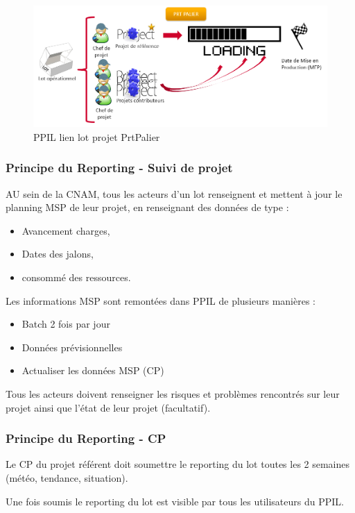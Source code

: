 \begin{figure}[!h]
\centering
\includegraphics[width=1\textwidth]{images/ppil lien lot projet prtpalier.png}
\caption{PPIL lien lot projet PrtPalier}
\end{figure}

\subsubsection{Principe du Reporting - Suivi de projet}

AU sein de la CNAM, tous les acteurs d’un lot renseignent et mettent à jour le planning MSP de leur projet, en renseignant des données de type :
\begin{itemize}
    \item Avancement charges, 
    \item Dates des jalons, 
    \item consommé des ressources.
\end{itemize}

Les informations MSP sont remontées dans PPIL de plusieurs manières :
\begin{itemize}
    \item Batch 2 fois par jour
    \item Données prévisionnelles
    \item Actualiser les données MSP (CP) 
\end{itemize}

Tous les acteurs doivent renseigner les risques et problèmes rencontrés sur leur projet ainsi que l'état de leur projet (facultatif).

\subsubsection{Principe du Reporting - CP}
Le CP du projet référent doit soumettre le reporting du lot toutes les 2 semaines (météo, tendance, situation).

Une fois soumis le reporting du lot est visible par tous les utilisateurs du PPIL.

